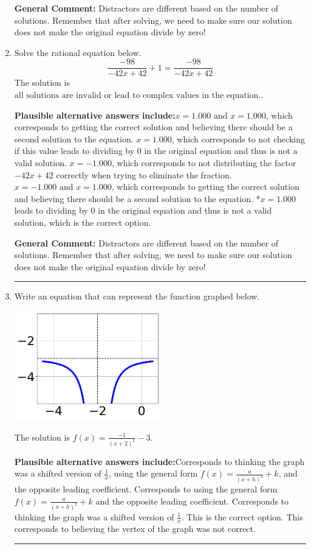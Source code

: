 \documentclass{extbook}[14pt]
\newcommand{\litem}[1]{\item #1

\rule{\textwidth}{0.4pt}}
\begin{document}
\begin{enumerate}
{\textbf{General Comment:} Distractors are different based on the number of solutions. Remember that after solving, we need to make sure our solution does not make the original equation divide by zero!
}
\litem{
Solve the rational equation below.
\[ \frac{-98}{-42x + 42} + 1 = \frac{-98}{-42x + 42} \]The solution is \( \text{all solutions are invalid or lead to complex values in the equation.} \).\begin{enumerate}[label=\Alph*.]
\textbf{Plausible alternative answers include:}$x = 1.000 \text{ and } x = 1.000$, which corresponds to getting the correct solution and believing there should be a second solution to the equation.
$x = 1.000$, which corresponds to not checking if this value leads to dividing by 0 in the original equation and thus is not a valid solution.
$x = -1.000$, which corresponds to not distributing the factor $-42x + 42$ correctly when trying to eliminate the fraction.
$x = -1.000 \text{ and } x = 1.000$, which corresponds to getting the correct solution and believing there should be a second solution to the equation.
*$x = 1.000$ leads to dividing by 0 in the original equation and thus is not a valid solution, which is the correct option.
\end{enumerate}

\textbf{General Comment:} Distractors are different based on the number of solutions. Remember that after solving, we need to make sure our solution does not make the original equation divide by zero!
}
\litem{
Write an equation that can represent the function graphed below.

\begin{center}
    \includegraphics[width=0.5\textwidth]{../Figures/rationalGraphToEquationB.png}
\end{center}


The solution is \( f(x) = \frac{-1}{(x + 2)^2} - 3 \).\begin{enumerate}[label=\Alph*.]
\textbf{Plausible alternative answers include:}Corresponds to thinking the graph was a shifted version of $\frac{1}{x}$, using the general form $f(x) = \frac{a}{(x+h)^2}+k$, and the opposite leading coefficient.
Corresponds to using the general form $f(x) = \frac{a}{(x+h)^2}+k$ and the opposite leading coefficient.
Corresponds to thinking the graph was a shifted version of $\frac{1}{x}$.
This is the correct option.
This corresponds to believing the vertex of the graph was not correct.
\end{enumerate}

}
\end{enumerate}
\end{document}
